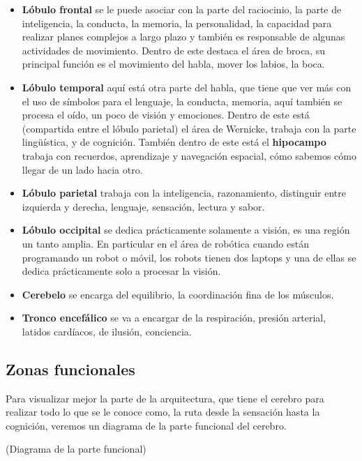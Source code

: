 \begin{itemize}
 \item \textbf{Lóbulo frontal} se le puede asociar con la parte del raciocinio,  la parte de inteligencia, la conducta, la memoria, la personalidad, la capacidad para realizar planes complejos a largo plazo y también es responsable de algunas actividades de movimiento. Dentro de este destaca el área de broca, su principal función es el movimiento del habla, mover los labios, la boca.
 \item \textbf{Lóbulo temporal} aquí está otra parte del habla, que tiene que ver más con el uso de símbolos para el lenguaje, la conducta, memoria, aquí también se procesa el oído, un poco de visión y emociones. Dentro de este está (compartida entre el lóbulo parietal) el área de Wernicke, trabaja con la parte lingüística, y de cognición. También dentro de este está el \textbf{hipocampo} trabaja con recuerdos, aprendizaje y navegación espacial, cómo sabemos cómo llegar de un lado hacia otro.
 \item \textbf{Lóbulo parietal} trabaja con la inteligencia, razonamiento, distinguir entre izquierda y derecha, lenguaje, sensación, lectura y sabor. 
 \item \textbf{Lóbulo occipital} se dedica prácticamente solamente a visión, es una región un tanto amplia. En particular en el área de robótica cuando están programando un robot o móvil, los robots tienen dos laptops y una de ellas se dedica prácticamente solo a procesar la visión.
 \item \textbf{Cerebelo} se encarga del equilibrio, la coordinación fina de los músculos.
 \item \textbf{Tronco encefálico} se va a encargar de la respiración, presión arterial, latidos cardíacos, de ilusión, conciencia. 

\end{itemize}

\subsection{Zonas funcionales}
Para visualizar mejor la parte de la arquitectura, que tiene el cerebro para realizar todo lo que se le conoce como,  la ruta desde la sensación hasta la cognición, veremos un diagrama de la parte funcional del cerebro.  

(Diagrama de la parte funcional)

